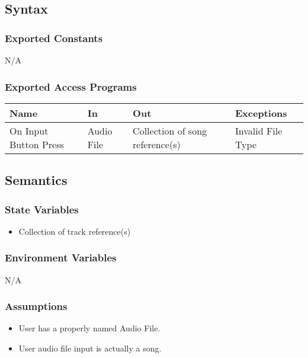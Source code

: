 \documentclass[12pt, titlepage]{article}
\begin{document}
\subsection{Syntax}

\subsubsection{Exported Constants}
N/A

\subsubsection{Exported Access Programs}

\begin{center}
\begin{tabular}{p{2cm} p{4cm} p{4cm} p{2cm}}
\hline
\textbf{Name} & \textbf{In} & \textbf{Out} & \textbf{Exceptions}\\
\hline%
On Input Button Press &Audio File &Collection of song reference(s) &Invalid File Type\\

\hline
\end{tabular}
\end{center}

\subsection{Semantics}

\subsubsection{State Variables}
\begin{itemize}
  \item Collection of track reference(s)
\end{itemize}

\subsubsection{Environment Variables}
N/A 

\subsubsection{Assumptions}
\begin{itemize}
  \item User has a properly named Audio File.
  \item User audio file input is actually a song. 
\end{itemize}
\end{document}
